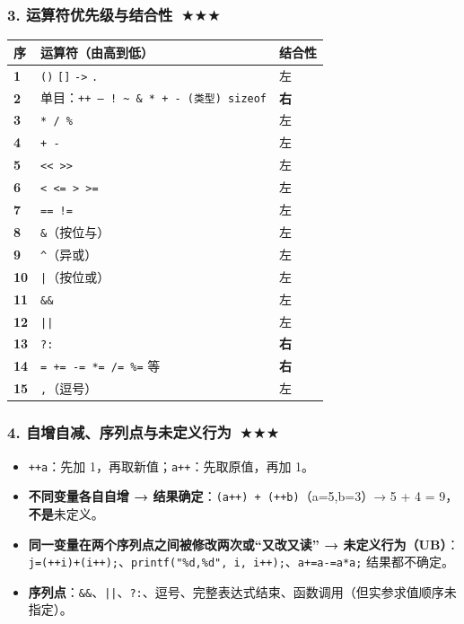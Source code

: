 \documentclass[UTF8,zihao=-4,a4paper]{ctexart}
\newcommand{\cstar}{\textcolor{deepred}{$\bigstar$}}
\begin{document}
\subsubsection*{3. 运算符优先级与结合性\ \cstar\cstar\cstar}
\begin{center}\small
\begin{tabularx}{\linewidth}{>{\bfseries}p{1.1cm} X >{\raggedright\arraybackslash}p{3.0cm}}
\toprule
序 & 运算符（由高到低） & 结合性\\
\midrule
1 & \texttt{()} \texttt{[]} \texttt{->} \texttt{.} & 左\\
2 & 单目：\texttt{++ -- ! \textasciitilde\ \& * + - (类型) sizeof} & \textbf{右}\\
3 & \texttt{* / \%} & 左\\
4 & \texttt{+ -} & 左\\
5 & \texttt{<< >>} & 左\\
6 & \texttt{< <= > >=} & 左\\
7 & \texttt{== !=} & 左\\
8 & \texttt{\&}（按位与） & 左\\
9 & \texttt{\^{}}（异或） & 左\\
10 & \texttt{|}（按位或） & 左\\
11 & \texttt{\&\&} & 左\\
12 & \texttt{||} & 左\\
13 & \texttt{?:} & \textbf{右}\\
14 & \texttt{= += -= *= /= \%=} 等 & \textbf{右}\\
15 & \texttt{,}（逗号） & 左\\
\bottomrule
\end{tabularx}
\end{center}

\subsubsection*{4. 自增自减、序列点与未定义行为\ \cstar\cstar\cstar}
\begin{itemize}
  \item \texttt{++a}：先加 1，再取新值；\texttt{a++}：先取原值，再加 1。
  \item \textbf{不同变量各自自增 → 结果确定}：\texttt{(a++) + (++b)}（a=5,b=3）→ 5 + 4 = 9，\textbf{不是}未定义。
  \item \textbf{同一变量在两个序列点之间被修改两次或“又改又读” → 未定义行为（UB）}：\texttt{j=(++i)+(i++);}、\texttt{printf("\%d,\%d", i, i++);}、\texttt{a+=a-=a*a;} 结果都不确定。
  \item \textbf{序列点}：\texttt{\&\&}、\texttt{||}、\texttt{?:}、逗号、完整表达式结束、函数调用（但实参求值顺序未指定）。
\end{itemize}
\end{document}
